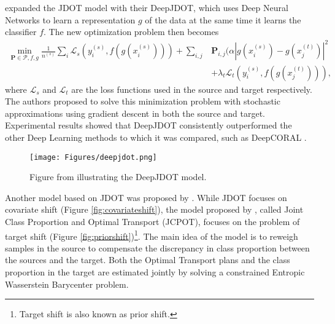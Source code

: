 \citet{damodaran2018deepjdot} expanded the JDOT model with their DeepJDOT, which uses Deep Neural Networks
to learn a representation $g$ of the data at the same time it learns the classifier $f$. The new optimization
problem then becomes
\begin{align}
  \nonumber
  \min_{\mathbf P \in \mathcal P, f,g} \frac{1}{n^{(s)}} \sum_i \mathcal L_s(y_{i}^{(s)}, f(g(x_i^{(s)})))
  + \sum_{i,j} & \mathbf P_{i,j} (\alpha |g(x_i^{(s)}) - g(x_j^{(t)})|^2 \\ &+
  \lambda_t \mathcal L_t (y_i^{(s)}, f(g(x_j^{(t)}))),
\end{align}
where $\mathcal L_s$ and $\mathcal L_t$ are the loss functions used in the source and target respectively.
The authors proposed to solve this minimization problem with stochastic approximations
using gradient descent in both the source and target.
Experimental results showed that DeepJDOT consistently outperformed the other Deep Learning methods to which
it was compared, such as DeepCORAL \citep{sun2016deep}.

\begin{figure}[H]
	\centering
	\texttt{[image: Figures/deepjdot.png]}
	\caption{Figure from \citet{damodaran2018deepjdot} illustrating the DeepJDOT model.}
	\label{fig:geometricdataset}
\end{figure}

Another model based on JDOT was proposed by \citet{redko2019optimal}. While JDOT focuses on covariate
shift (Figure \ref{fig:covariateshift}), the model proposed by \citet{redko2019optimal},
called Joint Class Proportion and Optimal Transport
(JCPOT), focuses on the problem of target shift (Figure \ref{fig:priorshift})\footnote{Target shift
is also known as prior shift.}. The main idea of the model is to
reweigh samples in the source to compensate the discrepancy in class proportion between the sources and the target.
Both the Optimal Transport plans and the class proportion in the target are estimated jointly by solving a
constrained Entropic Wasserstein Barycenter problem.

